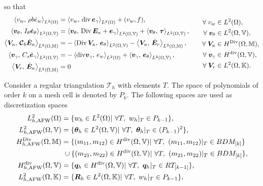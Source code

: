 so that 
\begin{equation}
\label{eq:weak_min_div_weak}
\begin{aligned}
\inner[L^2(\Omega)]{v_w}{\rho b \dot{e}_w} &= \inner[L^2(\Omega)]{v_w}{\div \bm{e}_\gamma} + (v_w, f), \\ 
\inner[L^2(\Omega, \mathbb{V})]{\bm{v}_\theta}{I_\theta \dot{\bm{e}}_\theta} &= \inner[L^2(\Omega, \mathbb{V})]{\bm{v}_\theta}{\Div \bm{E}_\kappa + \bm{e}_\gamma} + \inner[L^2(\Omega, \mathbb{V})]{\bm{v}_\theta}{\bm{\tau}}, \\  
\inner[L^2(\Omega, \mathbb{M})]{\bm{V}_\kappa}{\bm{\mathcal{C}}_{b} \dot{\bm{E}}_\kappa} &= -\inner[L^2(\Omega, \mathbb{V})]{\Div \bm{V}_\kappa}{\bm{e}_\theta} -  \inner[L^2(\Omega, \mathbb{M})]{\bm{V}_\kappa}{\dot{\bm{E}}_r}, \\ 
\inner[L^2(\Omega, \mathbb{V})]{\bm{v}_\gamma}{C_s \dot{\bm{e}}_\gamma} &= -\inner[L^2(\Omega)]{\mathrm{div} \bm{v}_\gamma}{e_w} + \inner[L^2(\Omega, \mathbb{V})]{\bm{v}_\gamma}{\bm{e}_{\theta}}, \\   
\inner[L^2(\Omega, \mathbb{M})]{\bm{V}_r}{\dot{\bm{E}}_\kappa} &= 0
\end{aligned} \qquad
\begin{aligned}
\forall \;v_w &\in L^2(\Omega), \\
\forall \; \bm{v}_\theta &\in L^2(\Omega, \mathbb{V}), \\
\forall \;\bm{V}_\kappa &\in H^{\Div}(\Omega, \mathbb{M}), \\
\forall \;\bm{v}_\gamma &\in H^{\div}(\Omega, \mathbb{V}), \\
\forall \;\bm{V}_r &\in L^2(\Omega, \mathbb{K}).\\
\end{aligned}
\end{equation}

Consider a regular triangulation $\mathcal{T}_h$ with elements $T$. The space of polynomials of order $k$ on a mesh cell is denoted by $P_k$. The following spaces are used as discretization spaces
\begin{equation}
\label{eq:AFW}
\begin{aligned}
L_{h, \text{AFW}}^2(\Omega) &= \{w_h \in L^2(\Omega) | \ \forall T, \ w_h|_{T} \in P_{k-1} \}, \\
L_{h, \text{AFW}}^2(\Omega, \mathbb{V}) &= \{\bm{\theta}_h \in L^2(\Omega, \mathbb{V}) | \ \forall T,\ \bm{\theta}_h|_{T} \in (P_{k-1})^2 \}, \\
H_{h, \text{AFW}}^{\Div}(\Omega, \mathbb{M}) &= \{(m_{11}, m_{12}) \in H^{\div}(\Omega, \mathbb{V})| \ \forall T,\ (m_{11}, m_{12})|_{T} \in BDM_{[k]} \}  \\
& \; \cup \{(m_{21}, m_{22}) \in H^{\div}(\Omega, \mathbb{V})| \ \forall T,\ (m_{21}, m_{22})|_{T} \in BDM_{[k]} \}, \\
H_{h, \text{AFW}}^{\div}(\Omega, \mathbb{V}) &= \{\bm{q}_h \in H^{\div}(\Omega, \mathbb{V}) | \ \forall T,\ \bm{q}_h|_{T} \in RT_{[k-1]} \}, \\
L_{h, \text{AFW}}^2(\Omega, \mathbb{K}) &= \{\bm{R}_h \in L^2(\Omega, \mathbb{K}) | \ \forall T, \ w_h|_{T} \in P_{k-1} \}, \\ 
\end{aligned}
\end{equation}


